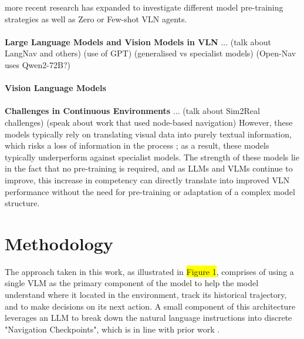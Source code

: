 \documentclass{svproc}
\begin{document}
    more recent research has expanded to investigate different model pre-training strategies \cite{9156554, Guhur_2021_ICCV} as well as Zero or Few-shot VLN agents. 
    \\ \\
    \textbf{Large Language Models and Vision Models in VLN}  ... (talk about LangNav and others) (use of GPT) (generalised vs specialist models) (Open-Nav uses Qwen2-72B?)
    \\ \\
    \textbf{Vision Language Models}
    \\ \\
    \textbf{Challenges in Continuous Environments} ... (talk about Sim2Real challenges) (speak about work that used node-based navigation)
    \newline
    However, these models typically rely on translating visual data into purely textual information, which risks a loss of information in the process \cite{pan2024langnavlanguageperceptualrepresentation}; as a result, these models typically underperform against specialist models. The strength of these models lie in the fact that no pre-training is required, and as LLMs and VLMs continue to improve, this increase in competency can directly translate into improved VLN performance without the need for pre-training or adaptation of a complex model structure.

\section{Methodology}
    The approach taken in this work, as illustrated in \colorbox{yellow}{Figure 1}, comprises of using a single VLM as the primary component of the model to help the model understand where it located in the environment, track its historical trajectory, and to make decisions on its next action. A small component of this architecture leverages an LLM to break down the natural language instructions into discrete "Navigation Checkpoints", which is in line with prior work \cite{ chen2024mapgptmapguidedpromptingadaptive, pan2024langnavlanguageperceptualrepresentation, zhou2023navgptexplicitreasoningvisionandlanguage}.
    
\end{document}
